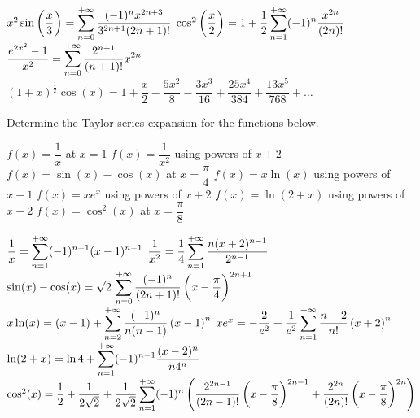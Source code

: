 \begin{Answer}\phantom{}
    
    \Question $ x^2 \sin \left(\dfrac{x}{3} \right) = \displaystyle\sum_{n=0}^{+\infty} \dfrac{(-1)^n x^{2n+3}}{3^{2n+1} (2n+1)!} $
    \Question $\cos^2\left(\dfrac{x}{2} \right) = 1 + \dfrac{1}{2} \displaystyle\sum_{n=1}^{+\infty} (-1)^n \dfrac{x^{2n}}{(2n)!}$
    \Question $\dfrac{e^{2x^2}-1}{x^2} = \displaystyle\sum_{n=0}^{+\infty} \dfrac{2^{n+1}}{(n+1)!} x^{2n} $
    \Question $(1+x)^{\frac{1}{2}} \cos (x) = 1 + \dfrac{x}{2} - \dfrac{5 x^2}{8} - \dfrac{3 x^3}{16} + \dfrac{25x^4}{384} + \dfrac{13 x^5}{768} + \ldots$
    
\end{Answer}


\begin{Exercise} Determine the Taylor series expansion for the functions below.
\begin{multicols}{2}
    \Question[difficulty = 2] $f(x) = \dfrac{1}{x}$  at $x=1$
    \Question[difficulty = 2] $f(x) = \dfrac{1}{x^2}$  using powers of $x+2$ 
    \Question[difficulty = 2] $f(x) = \sin (x) - \cos (x) $ at $x=\dfrac{\pi}{4}$
    \Question[difficulty = 2] $f(x)= x \ln (x)$ using powers of $x-1$
    \Question[difficulty = 2] $f(x) = x e^x$ using powers of $x+2$
    \Question[difficulty = 3] $f(x) = \ln(2+x)$  using powers of $x-2$
    \Question[difficulty = 3] $f(x) =  \cos^2 (x) $ at $x=\dfrac{\pi}{8}$
    \EndCurrentQuestion
\end{multicols}

\end{Exercise}

\begin{Answer}\phantom{}
    
    \Question $\dfrac{1}{x} = \displaystyle\sum_{n=1}^{+\infty} (-1)^{n-1} (x-1)^{n-1} $
    \Question $\dfrac{1}{x^2} = \dfrac{1}{4}\displaystyle\sum_{n=1}^{+\infty} \dfrac{n(x+2)^{n-1}}{2^{n-1}} $
    \Question $\sin (x) - \cos (x) = \sqrt{2}\, \displaystyle\sum_{n=0}^{+\infty} \dfrac{(-1)^n}{(2n+1)!}\left(x - \dfrac{\pi}{4} \right)^{2n+1}  $
    \Question $x \ln (x) = (x-1) + \displaystyle\sum_{n=2}^{+\infty} \dfrac{(-1)^n}{n(n-1)}\left(x - 1\right)^n $
    \Question $x e^x = -\dfrac{2}{e^2}+ \dfrac{1}{e^2}\displaystyle\sum_{n=1}^{+\infty} \dfrac{n-2}{n!} \left(x +2\right)^n  $
    \Question $\ln(2+x) =  \ln 4 + \displaystyle\sum_{n=1}^{+\infty} (-1)^{n-1} \dfrac{(x-2)^{n}}{n 4^{n}}  $
    \Question $\cos^2 (x) = \dfrac{1}{2} + \dfrac{1}{2\sqrt{2}} + \dfrac{1}{2\sqrt{2}}  \displaystyle\sum_{n=1}^{+\infty} (-1)^{n} \left( \dfrac{2^{2n-1}}{(2n-1)!}  \left(x - \dfrac{\pi}{8} \right)^{2n-1} + \dfrac{2^{2n}}{(2n)!}  \left(x - \dfrac{\pi}{8} \right)^{2n} \right) $
    
\end{Answer}
\fi

